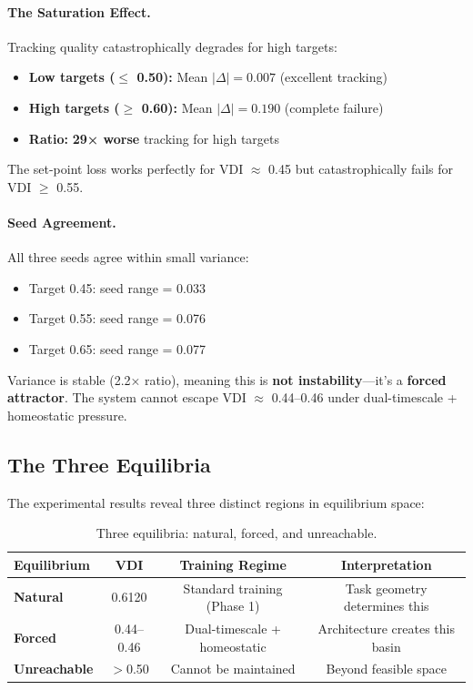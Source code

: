 \paragraph{The Saturation Effect.}
Tracking quality catastrophically degrades for high targets:
\begin{itemize}
\item \textbf{Low targets ($\leq$ 0.50):} Mean $|\Delta| = 0.007$ (excellent tracking)
\item \textbf{High targets ($\geq$ 0.60):} Mean $|\Delta| = 0.190$ (complete failure)
\item \textbf{Ratio:} \textbf{29× worse} tracking for high targets
\end{itemize}

The set-point loss works perfectly for VDI $\approx$ 0.45 but catastrophically fails for VDI $\geq$ 0.55.

\paragraph{Seed Agreement.}
All three seeds agree within small variance:
\begin{itemize}
\item Target 0.45: seed range = 0.033
\item Target 0.55: seed range = 0.076
\item Target 0.65: seed range = 0.077
\end{itemize}

Variance is stable (2.2× ratio), meaning this is \textbf{not instability}—it's a \textbf{forced attractor}. The system cannot escape VDI $\approx$ 0.44--0.46 under dual-timescale + homeostatic pressure.

\subsection{The Three Equilibria}

The experimental results reveal three distinct regions in equilibrium space:

\begin{table}[h]
\centering
\caption{Three equilibria: natural, forced, and unreachable.}
\label{tab:three-equilibria}
\begin{tabular}{lccc}
\toprule
Equilibrium & VDI & Training Regime & Interpretation \\
\midrule
\textbf{Natural} & 0.6120 & Standard training (Phase 1) & Task geometry determines this \\
\textbf{Forced} & 0.44--0.46 & Dual-timescale + homeostatic & Architecture creates this basin \\
\textbf{Unreachable} & $>$0.50 & Cannot be maintained & Beyond feasible space \\
\bottomrule
\end{tabular}
\end{table}

